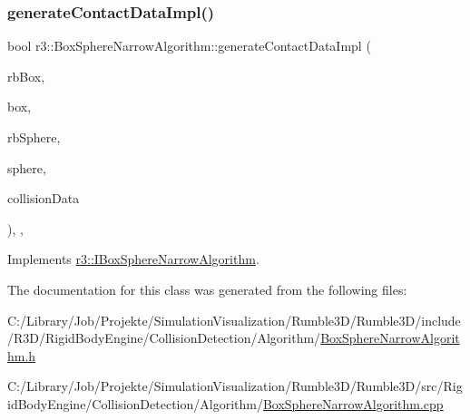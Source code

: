 \subsubsection{\texorpdfstring{generate\+Contact\+Data\+Impl()}{generateContactDataImpl()}}
{\footnotesize\ttfamily bool r3\+::\+Box\+Sphere\+Narrow\+Algorithm\+::generate\+Contact\+Data\+Impl (\begin{DoxyParamCaption}\item[{\mbox{\hyperlink{classr3_1_1_rigid_body}{Rigid\+Body}} $\ast$}]{rb\+Box,  }\item[{\mbox{\hyperlink{classr3_1_1_collision_box}{Collision\+Box}} $\ast$}]{box,  }\item[{\mbox{\hyperlink{classr3_1_1_rigid_body}{Rigid\+Body}} $\ast$}]{rb\+Sphere,  }\item[{\mbox{\hyperlink{classr3_1_1_collision_sphere}{Collision\+Sphere}} $\ast$}]{sphere,  }\item[{\mbox{\hyperlink{classr3_1_1_collision_data}{Collision\+Data}} \&}]{collision\+Data }\end{DoxyParamCaption})\hspace{0.3cm}{\ttfamily [override]}, {\ttfamily [protected]}, {\ttfamily [virtual]}}



Implements \mbox{\hyperlink{classr3_1_1_i_box_sphere_narrow_algorithm_af28bcda3eb527a6ee48a3b624e5d47e0}{r3\+::\+I\+Box\+Sphere\+Narrow\+Algorithm}}.



The documentation for this class was generated from the following files\+:\begin{DoxyCompactItemize}
\item 
C\+:/\+Library/\+Job/\+Projekte/\+Simulation\+Visualization/\+Rumble3\+D/\+Rumble3\+D/include/\+R3\+D/\+Rigid\+Body\+Engine/\+Collision\+Detection/\+Algorithm/\mbox{\hyperlink{_box_sphere_narrow_algorithm_8h}{Box\+Sphere\+Narrow\+Algorithm.\+h}}\item 
C\+:/\+Library/\+Job/\+Projekte/\+Simulation\+Visualization/\+Rumble3\+D/\+Rumble3\+D/src/\+Rigid\+Body\+Engine/\+Collision\+Detection/\+Algorithm/\mbox{\hyperlink{_box_sphere_narrow_algorithm_8cpp}{Box\+Sphere\+Narrow\+Algorithm.\+cpp}}\end{DoxyCompactItemize}
